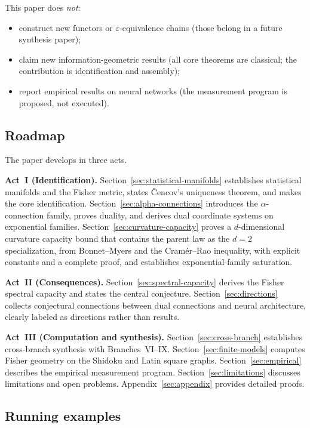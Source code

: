 \documentclass[11pt]{article}
\theoremstyle{remark}
\begin{document}
This paper does \emph{not}:
\begin{itemize}
  \item construct new functors or $\varepsilon$-equivalence chains (those belong
  in a future synthesis paper);
  \item claim new information-geometric results (all core theorems are
  classical; the contribution is identification and assembly);
  \item report empirical results on neural networks (the measurement program
  is proposed, not executed).
\end{itemize}

\subsection{Roadmap}

The paper develops in three acts.

\textbf{Act~I (Identification).}  Section~\ref{sec:statistical-manifolds}
establishes statistical manifolds and the Fisher metric, states \v{C}encov's
uniqueness theorem, and makes the core identification.
Section~\ref{sec:alpha-connections} introduces the $\alpha$-connection family,
proves duality, and derives dual coordinate systems on exponential families.
Section~\ref{sec:curvature-capacity} proves a $d$-dimensional curvature capacity
bound that contains the parent law as the $d{=}2$ specialization,
from Bonnet--Myers and the Cram\'er--Rao inequality, with explicit constants
and a complete proof, and establishes exponential-family saturation.

\textbf{Act~II (Consequences).}  Section~\ref{sec:spectral-capacity} derives
the Fisher spectral capacity and states the central conjecture.
Section~\ref{sec:directions} collects conjectural connections between dual
connections and neural architecture, clearly labeled as directions rather than
results.

\textbf{Act~III (Computation and synthesis).}
Section~\ref{sec:cross-branch} establishes cross-branch synthesis with
Branches~VI--IX.  Section~\ref{sec:finite-models} computes Fisher geometry on
the Shidoku and Latin square graphs.  Section~\ref{sec:empirical} describes the
empirical measurement program.  Section~\ref{sec:limitations} discusses
limitations and open problems.  Appendix~\ref{sec:appendix} provides detailed
proofs.

\subsection{Running examples}\label{subsec:running-examples}
\end{document}
